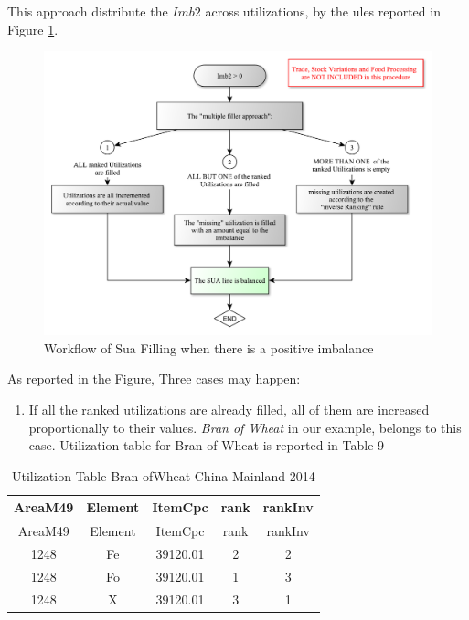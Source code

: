\documentclass[]{article}
\providecommand{\tightlist}{%
  \setlength{\itemsep}{0pt}\setlength{\parskip}{0pt}}
\begin{document}
This approach distribute the \(Imb2\) across utilizations, by the ules
reported in Figure \ref{fig:f7}.

\begin{figure}

{\centering \includegraphics{images/07_PositiveImbalance} 

}

\caption{\label{fig:f5}Workflow of Sua Filling when there is a positive imbalance}\label{fig:f7}
\end{figure}

As reported in the Figure, Three cases may happen:

\begin{enumerate}
\def\labelenumi{\arabic{enumi}.}
\tightlist
\item
  If all the ranked utilizations are already filled, all of them are
  increased proportionally to their values. \emph{Bran of Wheat} in our
  example, belongs to this case. Utilization table for Bran of Wheat is
  reported in Table 9
\end{enumerate}

\begin{longtable}[]{@{}ccccc@{}}
\caption{Utilization Table Bran ofWheat China Mainland
2014}\tabularnewline
\toprule
AreaM49 & Element & ItemCpc & rank & rankInv\tabularnewline
\midrule
\endfirsthead
\toprule
AreaM49 & Element & ItemCpc & rank & rankInv\tabularnewline
\midrule
\endhead
1248 & Fe & 39120.01 & 2 & 2\tabularnewline
1248 & Fo & 39120.01 & 1 & 3\tabularnewline
1248 & X & 39120.01 & 3 & 1\tabularnewline
\bottomrule
\end{longtable}
\end{document}
